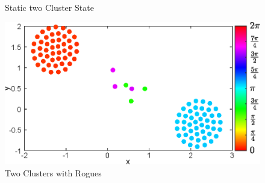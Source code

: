 \documentclass[twocolumn,10pt]{asme2ej}
\begin{document}
{\begin{figure}[h!]
        \caption{Static two Cluster State}
    \end{figure}
    \begin{figure}[h!]
        \includegraphics[width = \linewidth]{twoClustersWithR100.eps}
        \caption{Two Clusters with Rogues}
    \end{figure}

}
\end{document}
